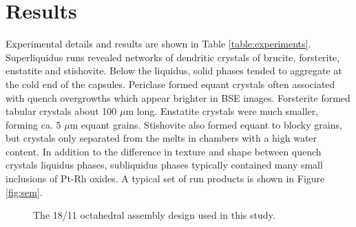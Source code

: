 \documentclass[review]{elsarticle}
\begin{document}
\section{Results}
Experimental details and results are shown in Table \ref{table:experiments}. Superliquidus runs revealed networks of dendritic crystals of brucite, forsterite, enstatite and stishovite. Below the liquidus, solid phases tended to aggregate at the cold end of the capsules. Periclase formed equant crystals often associated with quench overgrowths which appear brighter in BSE images. Forsterite formed tabular crystals about 100 $\mu$m long. Enstatite crystals were much smaller, forming ca. 5 $\mu$m equant grains. Stishovite also formed equant to blocky grains, but crystals only separated from the melts in chambers with a high water content. In addition to the difference in texture and shape between quench crystals liquidus phases, subliquidus phases typically contained many small inclusions of Pt-Rh oxides. A typical set of run products is shown in Figure \ref{fig:sem}.

\begin{figure}[h!]
  \centering
  \caption{The 18/11 octahedral assembly design used in this study.}
  \label{fig:assembly}
\end{figure}
\end{document}
